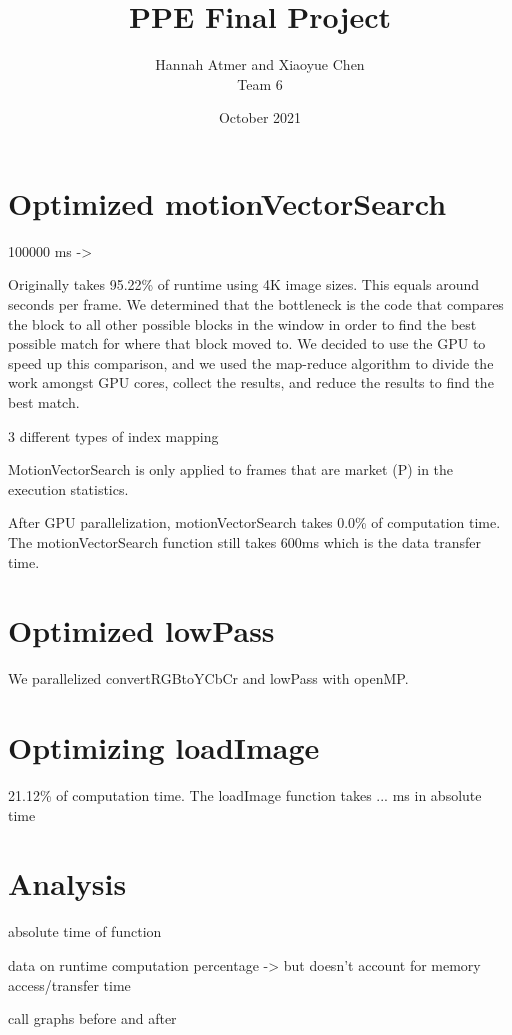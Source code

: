 \documentclass{article}
\title{PPE Final Project}
\author{Hannah Atmer and Xiaoyue Chen \\ Team 6}
\date{October 2021}
\begin{document}
\maketitle


\section{Optimized motionVectorSearch}

100000 ms -> 

Originally takes 95.22\% of runtime using 4K image sizes. This equals around  seconds per frame.
We determined that the bottleneck is the code that compares the block to all other possible blocks in the window in order to find the best possible match for where that block moved to.
We decided to use the GPU to speed up this comparison, and we used the map-reduce algorithm to divide the work amongst GPU cores, collect the results, and reduce the results to find the best match.

3 different types of index mapping


MotionVectorSearch is only applied to frames that are market (P) in the execution statistics. 

After GPU parallelization, motionVectorSearch takes 0.0\% of computation time. The motionVectorSearch function still takes 600ms which is the data transfer time.


\section{Optimized lowPass}

We parallelized convertRGBtoYCbCr and lowPass with openMP.


\section{Optimizing loadImage}

21.12\% of computation time. The loadImage function takes ... ms in absolute time

\section{Analysis}

absolute time of function

data on runtime computation percentage
-> but doesn't account for memory access/transfer time

call graphs before and after
\end{document}

